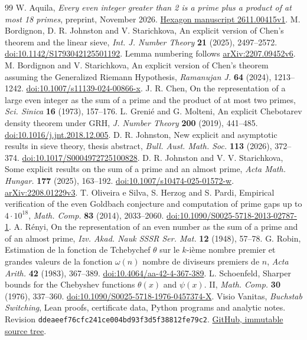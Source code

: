 \documentclass[11pt]{article}
\theoremstyle{remark}\newtheorem{remark}[theorem]{Remark}
\begin{document}
\small
\begin{thebibliography}{99}
\setlength{\itemsep}{3pt plus 1pt minus 1pt}
 W. Aquila, \emph{Every even integer greater than 2 is a prime plus a product of at most 18 primes}, preprint, November 2026. \href{https://hexagonmath.org/pdf/2611.00415v1}{Hexagon manuscript 2611.00415v1}.
 M. Bordignon, D. R. Johnston and V. Starichkova, An explicit version of Chen's theorem and the linear sieve, \emph{Int. J. Number Theory} \textbf{21} (2025), 2497--2572. \href{https://doi.org/10.1142/S1793042125501192}{doi:10.1142/S1793042125501192}. Lemma numbering follows \href{https://arxiv.org/abs/2207.09452v6}{arXiv:2207.09452v6}.
 M. Bordignon and V. Starichkova, An explicit version of Chen's theorem assuming the Generalized Riemann Hypothesis, \emph{Ramanujan J.} \textbf{64} (2024), 1213--1242. \href{https://doi.org/10.1007/s11139-024-00866-x}{doi:10.1007/s11139-024-00866-x}.
 J. R. Chen, On the representation of a large even integer as the sum of a prime and the product of at most two primes, \emph{Sci. Sinica} \textbf{16} (1973), 157--176.
 L. Grenié and G. Molteni, An explicit Chebotarev density theorem under GRH, \emph{J. Number Theory} \textbf{200} (2019), 441--485. \href{https://doi.org/10.1016/j.jnt.2018.12.005}{doi:10.1016/j.jnt.2018.12.005}.
 D. R. Johnston, New explicit and asymptotic results in sieve theory, thesis abstract, \emph{Bull. Aust. Math. Soc.} \textbf{113} (2026), 372--374. \href{https://doi.org/10.1017/S0004972725100828}{doi:10.1017/S0004972725100828}.
 D. R. Johnston and V. V. Starichkova, Some explicit results on the sum of a prime and an almost prime, \emph{Acta Math. Hungar.} \textbf{177} (2025), 163--192. \href{https://doi.org/10.1007/s10474-025-01572-w}{doi:10.1007/s10474-025-01572-w}. \href{https://arxiv.org/abs/2208.01229v3}{arXiv:2208.01229v3}.
 T. Oliveira e Silva, S. Herzog and S. Pardi, Empirical verification of the even Goldbach conjecture and computation of prime gaps up to $4\cdot10^{18}$, \emph{Math. Comp.} \textbf{83} (2014), 2033--2060. \href{https://doi.org/10.1090/S0025-5718-2013-02787-1}{doi:10.1090/S0025-5718-2013-02787-1}.
 A. Rényi, On the representation of an even number as the sum of a prime and of an almost prime, \emph{Izv. Akad. Nauk SSSR Ser. Mat.} \textbf{12} (1948), 57--78.
 G. Robin, Estimation de la fonction de Tchebychef $\theta$ sur le $k$-ième nombre premier et grandes valeurs de la fonction $\omega(n)$ nombre de diviseurs premiers de $n$, \emph{Acta Arith.} \textbf{42} (1983), 367--389. \href{https://doi.org/10.4064/aa-42-4-367-389}{doi:10.4064/aa-42-4-367-389}.
 L. Schoenfeld, Sharper bounds for the Chebyshev functions $\theta(x)$ and $\psi(x)$. II, \emph{Math. Comp.} \textbf{30} (1976), 337--360. \href{https://doi.org/10.1090/S0025-5718-1976-0457374-X}{doi:10.1090/S0025-5718-1976-0457374-X}.
 Visio Vanitas, \emph{Buchstab Switching}, Lean proofs, certificate data, Python programs and analytic notes. Revision \texttt{ddeaeef76cfc241ce004bd93f3d5f38812fe79c2}. \href{https://github.com/Visio-Vanitas/buchstab-switching/tree/ddeaeef76cfc241ce004bd93f3d5f38812fe79c2}{GitHub, immutable source tree}.
\end{thebibliography}
\end{document}
